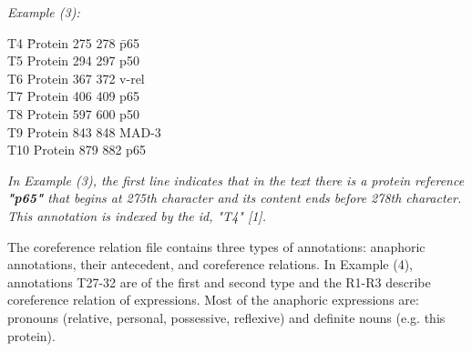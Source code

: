\emph{Example (3):}
{\selectfont
	\begin{tabbing}
		\hspace{3cm} T4	\hspace{5mm}\=  Protein 275 278	\hspace{5mm} \= p65\\
		\hspace{3cm} T5 \> Protein 294 297 \> p50\\
		\hspace{3cm} T6	\> Protein 367 372 \> v-rel\\
		\hspace{3cm} T7	\> Protein 406 409 \> p65\\
		\hspace{3cm} T8	\> Protein 597 600 \> p50\\
		\hspace{3cm} T9	\> Protein 843 848 \> MAD-3\\
		\hspace{3cm} T10 \> Protein 879 882 \> p65\\
	\end{tabbing}
}
\vspace{5mm} 

\emph{In Example (3), the first line indicates that in the text there is a protein reference \textbf{"p65"} that begins at 275th character and its content ends before 278th character. This annotation is indexed by the id, "T4" [1].}

The coreference relation file contains three types of annotations: anaphoric annotations, their antecedent, and coreference relations. In Example (4), annotations T27-32 are of the first and second type and the R1-R3 describe coreference relation of expressions. Most of the anaphoric expressions are: pronouns (relative, personal, possessive, reflexive) and definite nouns (e.g. this protein).\\

